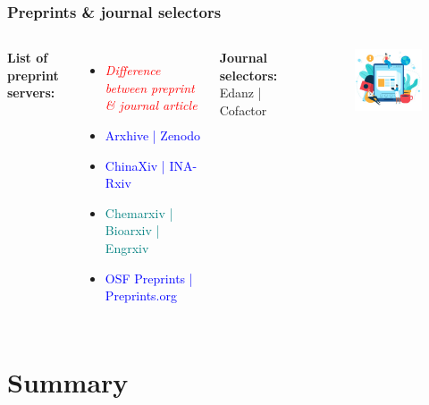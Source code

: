 \documentclass[newPxFont,sthlmFooter]{beamer}
\newcommand{\fs}{\footnotesize}
\begin{document}
\begin{frame}\frametitle{Preprints \& journal selectors}
  \begin{columns}[T,onlytextwidth]
      \vspace{0.5cm}
      {\fs \bf List of preprint servers:}\\
  \begin{itemize}
    \fs
    	\item \textcolor{red}{\it Difference between preprint \& journal article}
	\item \textcolor{blue}{Arxhive | Zenodo}
	\item \textcolor{blue}{ChinaXiv | INA-Rxiv}
	\item \textcolor{teal}{Chemarxiv | Bioarxiv | Engrxiv}
	\item \textcolor{blue}{OSF Preprints | Preprints.org}
  \end{itemize}
        {\fs {\bf Journal selectors:} Edanz | Cofactor }
              \vspace{-0.5cm}
  \begin{figure}
    \centering
    \includegraphics[width=2in]{figs/jnl} 
  \end{figure}
  \end{columns}
\end{frame}

\section{Summary}
\end{document}

